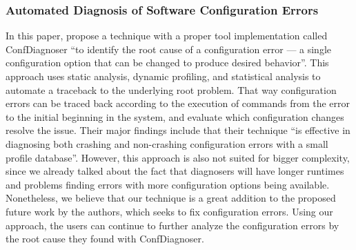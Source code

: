 \documentclass[english,bachelor]{swsLeipzig}
\begin{document}
\subsubsection{Automated Diagnosis of Software Configuration Errors}
In this paper, \citet{zhang:2013} propose a technique with a proper tool implementation called ConfDiagnoser 
``to identify the root cause of a configuration error --- a single configuration option that can be changed to produce desired behavior''. This approach uses static analysis, dynamic profiling, and statistical analysis to automate a traceback to the underlying root problem. That way configuration errors can be traced back according to the execution of commands from the error to the initial beginning in the system, and evaluate which configuration changes resolve the issue. Their major findings include that their technique ``is effective in diagnosing both crashing and non-crashing configuration errors with a small profile database''. However, this approach is also not suited for bigger complexity, since we already talked about the fact that diagnosers will have longer runtimes and problems finding errors with more configuration options being available. Nonetheless, we believe that our technique is a great addition to the proposed future work by the authors, which seeks to fix configuration errors. Using our approach, the users can continue to further analyze the configuration errors by the root cause they found with ConfDiagnoser.
\end{document}
